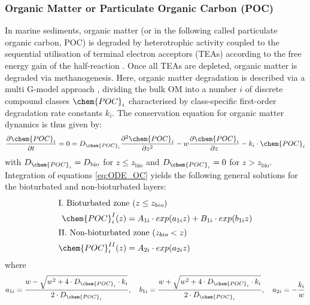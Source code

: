 \documentclass[gmd, manuscript]{copernicus}
\begin{document}
\subsubsection{Organic Matter or Particulate Organic Carbon (POC)}\label{subsubsec:OM}
In marine sediments, organic matter (or in the following called particulate organic carbon, POC) is degraded by heterotrophic activity coupled to the sequential utilisation of terminal electron acceptors (TEAs) 
according to the free energy gain of the half-reaction 
\citep[$\chem{O_2} > \chem{NO_3^-}> \chem{MnO_2} > \chem{Fe(OH)_3} > \chem{SO_4^{2-}}$, e.g.][]{stumm_aquatic_2012}. Once all TEAs are depleted, organic matter is degraded via methanogenesis. 
Here, organic matter degradation is described via a multi G-model approach \citep{joergensen_comparison_1978_2}, 
dividing the bulk OM into a number $i$ of discrete compound classes $\chem{POC}_i$ characterised by class-specific first-order degradation rate constants $k_i$. 
The conservation equation for organic matter dynamics is thus given by:
\begin{equation}
 \frac{\partial \chem{POC}_i}{\partial t} = 0= D_{\chem{POC}_i} \frac{\partial^2\chem{POC}_i }{\partial z^2} - w\frac{\partial \chem{POC}_i }{\partial z} - k_i\cdot \chem{POC}_{i} \label{eq:ODE_OC}
\end{equation}
with $D_{\chem{POC}_i}=D_{\mathrm{bio}}$ for $z\leq z_{\mathrm{bio}}$ and $D_{\chem{POC}_i}=0$ for $z > z_{\mathrm{bio}}$. 
Integration of equations \eqref{eq:ODE_OC} yields the following general solutions for the bioturbated and non-bioturbated layers:
\begin{align}
\intertext{I. Bioturbated zone ($z\leq z_{bio}$)}
 \chem{POC}_{i}^I(z) &= A_{1i}\cdot exp(a_{1i} z)+B_{1i}\cdot exp(b_{1i} z) \label{eq:GS_OM1}\\%
\intertext{II. Non-bioturbated zone ($z_{bio} < z$)}
 \chem{POC}_{i}^{II}(z) &= A_{2i}\cdot exp(a_{2i} z) \label{eq:GS_OM2}%
\end{align}
where
\begin{equation} 
 a_{1i} = \frac{w - \sqrt{w^2+4\cdot D_{\chem{POC}_i}\cdot k_i}}{2\cdot D_{\chem{POC}_i}}, \quad b_{1i} = \frac{w + \sqrt{w^2+4\cdot D_{\chem{POC}_i}\cdot k_i}}{2\cdot D_{\chem{POC}_i}}, \quad a_{2i} = -\frac{k_i}{w}
\end{equation}
\end{document}
